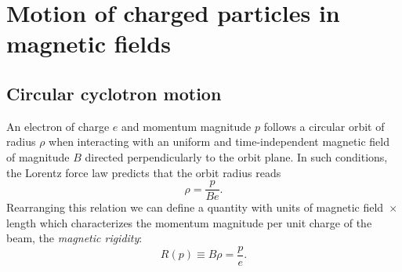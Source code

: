 \section{Motion of charged particles in magnetic fields}
\subsection{Circular cyclotron motion}
An electron of charge $e$ and momentum magnitude $p$ follows a circular orbit of radius $\rho$ when interacting with an uniform and time-independent magnetic field of magnitude $B$ directed perpendicularly to the orbit plane. In such conditions, the Lorentz force law predicts that the orbit radius reads
\begin{equation}
    \rho = \frac{p}{Be}.
    \label{eq:Lorentz}
\end{equation}
Rearranging this relation we can define a quantity with units of magnetic field~$\times$ length which characterizes the momentum magnitude per unit charge of the beam, the \textit{magnetic rigidity}:
\begin{equation}
    R(p) \equiv B\rho = \frac{p}{e}.
    \label{eq:rigidity}
\end{equation}
